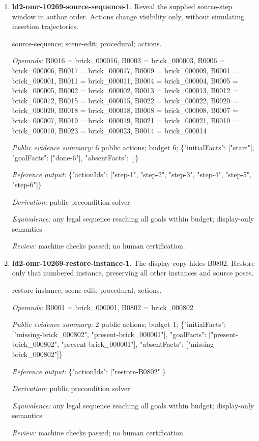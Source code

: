 \begin{enumerate}
\item \textbf{ld2-omr-10269-source-sequence-1}. Reveal the supplied source-step window in author order. Actions change visibility only, without simulating insertion trajectories.
\par{\small source-sequence; scene-edit; procedural; actions.\par\textit{Operands:} B0016 = brick\_000016, B0003 = brick\_000003, B0006 = brick\_000006, B0017 = brick\_000017, B0009 = brick\_000009, B0001 = brick\_000001, B0011 = brick\_000011, B0004 = brick\_000004, B0005 = brick\_000005, B0002 = brick\_000002, B0013 = brick\_000013, B0012 = brick\_000012, B0015 = brick\_000015, B0022 = brick\_000022, B0020 = brick\_000020, B0018 = brick\_000018, B0008 = brick\_000008, B0007 = brick\_000007, B0019 = brick\_000019, B0021 = brick\_000021, B0010 = brick\_000010, B0023 = brick\_000023, B0014 = brick\_000014\par\textit{Public evidence summary:} 6 public actions; budget 6; \{"initialFacts": ["start"], "goalFacts": ["done-6"], "absentFacts": []\}\par\textit{Reference output:} \{"actionIds": ["step-1", "step-2", "step-3", "step-4", "step-5", "step-6"]\}\par\textit{Derivation:} public precondition solver\par\textit{Equivalence:} any legal sequence reaching all goals within budget; display-only semantics\par\textit{Review:} machine checks passed; no human certification.}
\item \textbf{ld2-omr-10269-restore-instance-1}. The display copy hides B0802. Restore only that numbered instance, preserving all other instances and source poses.
\par{\small restore-instance; scene-edit; procedural; actions.\par\textit{Operands:} B0001 = brick\_000001, B0802 = brick\_000802\par\textit{Public evidence summary:} 2 public actions; budget 1; \{"initialFacts": ["missing-brick\_000802", "present-brick\_000001"], "goalFacts": ["present-brick\_000802", "present-brick\_000001"], "absentFacts": ["missing-brick\_000802"]\}\par\textit{Reference output:} \{"actionIds": ["restore-B0802"]\}\par\textit{Derivation:} public precondition solver\par\textit{Equivalence:} any legal sequence reaching all goals within budget; display-only semantics\par\textit{Review:} machine checks passed; no human certification.}

\end{enumerate}

